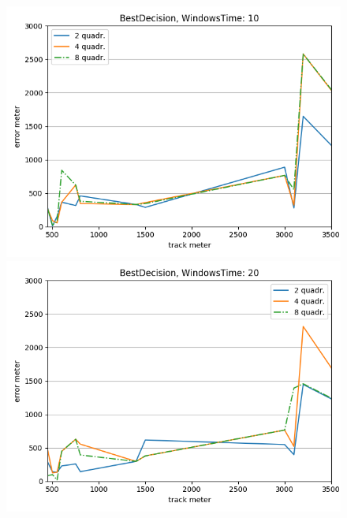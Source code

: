 \documentclass[12pt,a4paper,openright,twoside]{report}
\begin{document}
\begin{figure}[H]
\centering  
\includegraphics[scale=0.4]{thirdChartBestDecision-10} 
\includegraphics[scale=0.4]{thirdChartBestDecision-20} 
\end{figure}
\end{document}

